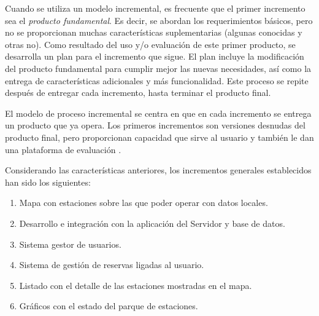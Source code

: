 Cuando se utiliza un modelo incremental, es frecuente que el primer incremento sea el \emph{producto fundamental}. Es decir, se abordan los requerimientos básicos, pero no se proporcionan muchas características suplementarias (algunas conocidas y otras no). Como resultado del uso y/o evaluación de este primer producto, se desarrolla un plan para el incremento que sigue. El plan incluye la modificación del producto fundamental para cumplir mejor las nuevas necesidades, así como la entrega de características adicionales y más funcionalidad. Este proceso se repite después de entregar cada incremento, hasta terminar el producto final.

El modelo de proceso incremental se centra en que en cada incremento se entrega un producto que ya opera. Los primeros incrementos son versiones desnudas del producto final, pero proporcionan capacidad que sirve al usuario y también le dan una plataforma de evaluación \cite{Pre10}.

Considerando las características anteriores, los incrementos generales establecidos han sido los siguientes:

\begin{enumerate}  
	\item Mapa con estaciones sobre las que poder operar con datos locales.
	\item Desarrollo e integración con la aplicación del Servidor y base de datos.
	\item Sistema gestor de usuarios.
	\item Sistema de gestión de reservas ligadas al usuario.
	\item Listado con el detalle de las estaciones mostradas en el mapa.
	\item Gráficos con el estado del parque de estaciones.
\end{enumerate}


